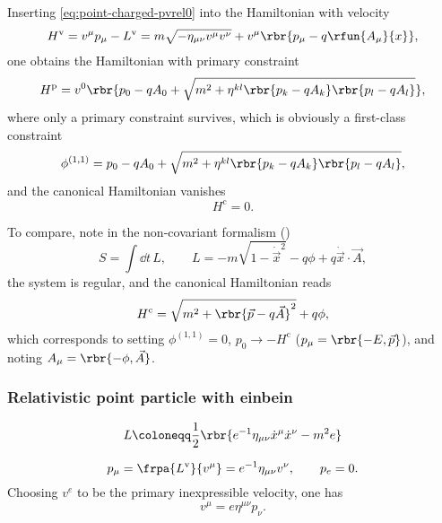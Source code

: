 \documentclass[a4paper,11pt]{article}
\begin{document}
Inserting \cref{eq:point-charged-pvrel0} into the Hamiltonian with velocity
\begin{equation}
H^\text{v} = v^\mu p_\mu - L^\text{v} = m\sqrt{-\eta_{\mu\nu}v^\mu v^\nu} + 
v^\mu\rbr{p_\mu - q \rfun{A_\mu}{x}},
\end{equation}
one obtains the Hamiltonian with primary constraint
\begin{equation}
H^\text{p} = v^0 \rbr{p_0 - q A_0 + \sqrt{m^2 + \eta^{kl}
\rbr{p_k - q A_k}\rbr{p_l - q A_l}}},
\end{equation}
where only a primary constraint survives, which is obviously a first-class 
constraint
\begin{equation}
\phi^{(1,1)} = p_0 - q A_0 + \sqrt{m^2 + \eta^{kl}
\rbr{p_k - q A_k}\rbr{p_l - q A_l}},
\end{equation}
and the canonical Hamiltonian vanishes
\begin{equation}
H^\text{c} = 0.
\end{equation}

To compare, note in the non-covariant formalism (\cite[sec.\ 8]{Landau1975})
\begin{equation}
S = \int \dd t\,L,\qquad L = -m\sqrt{1-\dot{\vec{x}}^2} - q \phi +
q \dot{\vec{x}} \cdot \vec{A},
\end{equation}
the system is regular, and the canonical Hamiltonian reads
\begin{equation}
H^\text{c} = \sqrt{m^2 + \rbr{\vec{p}-q\vec{A}}^2} + q\phi,
\end{equation}
which corresponds to setting $\phi^{(1,1)} = 0$, $p_0 \to -H^\text{c}$ 
($p_\mu = \rbr{-E, \vec{p}}$), and noting $A_\mu = \rbr{-\phi, \vec{A}}$.

\subsubsection*{Relativistic point particle with einbein}

\cite[sec.\ 2.1]{Blumenhagen2013}
\begin{equation}
L \coloneqq \frac{1}{2} \rbr{e^{-1}\eta_{\mu\nu}\dot{x}^\mu \dot{x}^\nu - m^2 e}
\label{eq:point-aux-lagrangian}
\end{equation}

\begin{equation}
p_\mu = \frpa{L^\text{v}}{v^\mu} = e^{-1}\eta_{\mu\nu}v^\nu, \qquad
p_e = 0.
\end{equation}
Choosing $v^e$ to be the primary inexpressible velocity, one has
\begin{equation}
v^\mu = e\eta^{\mu\nu}p_\nu.
\end{equation}
\end{document}
